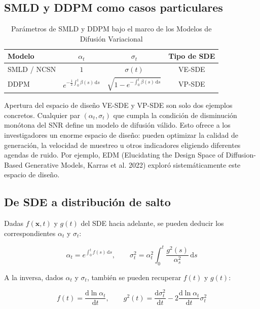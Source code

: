 \documentclass[a4paper]{article}
\begin{document}
\subsection{SMLD y DDPM como casos particulares}

\begin{table}[H]
\centering
\begin{tabular}{lccc}
\toprule
\textbf{Modelo} & $\alpha_t$ & $\sigma_t$ & \textbf{Tipo de SDE} \\
\midrule
SMLD / NCSN & $1$ & $\sigma(t)$ & VE-SDE \\
DDPM & $e^{-\frac{1}{2}\int_0^t \beta(s)\,\mathrm{d}s}$ & $\sqrt{1 - e^{-\int_0^t \beta(s)\,\mathrm{d}s}}$ & VP-SDE \\
\bottomrule
\end{tabular}
\caption{Parámetros de SMLD y DDPM bajo el marco de los Modelos de Difusión Variacional}
\end{table}

\begin{knowledgebox}{Apertura del espacio de diseño}
VE-SDE y VP-SDE son solo dos ejemplos concretos. Cualquier par $(\alpha_t, \sigma_t)$ que cumpla la condición de disminución monótona del SNR define un modelo de difusión válido. Esto ofrece a los investigadores un enorme espacio de diseño: pueden optimizar la calidad de generación, la velocidad de muestreo u otros indicadores eligiendo diferentes agendas de ruido. Por ejemplo, EDM (Elucidating the Design Space of Diffusion-Based Generative Models, Karras et al. 2022) exploró sistemáticamente este espacio de diseño.
\end{knowledgebox}

\subsection{De SDE a distribución de salto}

Dadas $f(\mathbf{x}, t)$ y $g(t)$ del SDE hacia adelante, se pueden deducir los correspondientes $\alpha_t$ y $\sigma_t$:

$$
\alpha_t = e^{\int_0^t f(s)\,\mathrm{d}s}, \qquad \sigma_t^2 = \alpha_t^2 \int_0^t \frac{g^2(s)}{\alpha_s^2}\,\mathrm{d}s
$$

A la inversa, dados $\alpha_t$ y $\sigma_t$, también se pueden recuperar $f(t)$ y $g(t)$:

$$
f(t) = \frac{\mathrm{d} \ln \alpha_t}{\mathrm{d}t}, \qquad g^2(t) = \frac{\mathrm{d}\sigma_t^2}{\mathrm{d}t} - 2\frac{\mathrm{d} \ln \alpha_t}{\mathrm{d}t}\sigma_t^2
$$
\end{document}
